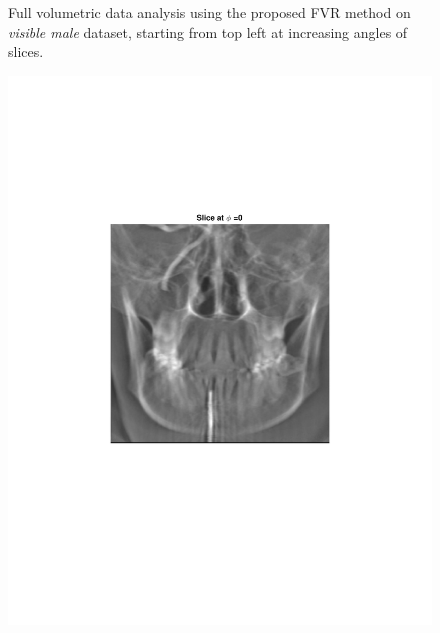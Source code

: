 \documentclass{UCF_ETD}
\begin{document}
\begin{figure}[H]
\begin{center}
\caption{Full volumetric data analysis using the proposed FVR method on \emph{visible male} dataset, starting from top left at increasing angles of slices.}
\label{FullVolumetricData.fig}
\end{center}
\end{figure}

\begin{figure}[H]   
\begin{center}
\includegraphics[scale=0.5]{FVR/CompCT_2Slice0}

\end{center}
\end{figure}
\end{document}
